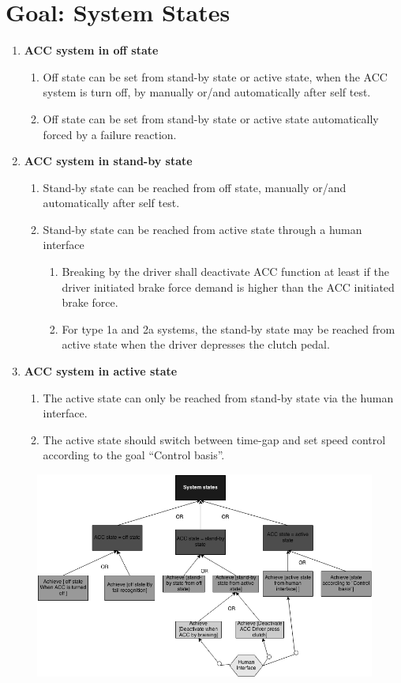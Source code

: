 \section{Goal: System States}

	\begin{enumerate}
		\item {\bf ACC system in off state}
			\begin{enumerate}[label*=\arabic*.]
				\item Off state can be set from stand-by state or active state, when 
				the ACC system is turn off, by manually or/and automatically after self test.
				\item Off state can be set from stand-by state or active state automatically
				forced by a failure reaction.
			\end{enumerate}
		\item {\bf ACC system in stand-by state}
			\begin{enumerate}[label*=\arabic*.]
				\item Stand-by state can be reached from off state, manually or/and 
				automatically after self test.
				\item Stand-by state can be reached from active state through a human 
				interface
					\begin{enumerate}[label*=\arabic*.]
						\item Breaking by the driver shall deactivate ACC function at least 
						if the driver initiated brake force demand is higher than the ACC 
						initiated brake force.
						\item For type 1a and 2a systems, the stand-by state may be reached
						from active state when the driver depresses the clutch pedal.
					\end{enumerate}
			\end{enumerate}
		\item {\bf ACC system in active state}
			\begin{enumerate}[label*=\arabic*.]
				\item The active state can only be reached from stand-by state via the human
				interface. 
				\item The active state should switch between time-gap and set speed control
				according to the goal “Control basis”. 
			\end{enumerate}
	\end{enumerate}

	\begin{figure}[H]
		\includegraphics[width=\textwidth]{pics/SystemStates.png}
	\end{figure}